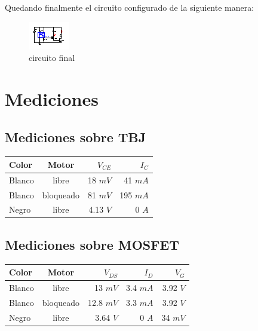 \documentclass[a4paper]{article}
\begin{document}
Quedando finalmente el circuito configurado de la siguiente manera:

\begin{figure}[H]
  \centering
    \includegraphics[width=\textwidth]{./xcircuit/Page_2.eps}
  \caption{circuito final}
\end{figure}

\section{Mediciones}

\subsection{Mediciones sobre TBJ}

\begin{tabular}{||l | c | r | r ||}
\hline
\hline
Color & Motor & $V_{CE}$ & $I_C$ \\
\hline
Blanco & libre & 18 $mV$ & 41 $mA$ \\
\hline
Blanco & bloqueado & 81 $mV$ & 195 $mA$\\
\hline
Negro & libre & 4.13 $V$ & 0 $A$\\
\hline
\end{tabular}

\subsection{Mediciones sobre MOSFET}

\begin{tabular}{||l | c | r | r | r||}
\hline
\hline
Color & Motor & $V_{DS}$ & $I_D$ & $V_G$\\
\hline
Blanco & libre & 13 $mV$ & 3.4 $mA$ & 3.92 $V$ \\
\hline
Blanco & bloqueado & 12.8 $mV$ & 3.3 $mA$ & 3.92 $V$ \\
\hline
Negro & libre & 3.64 $V$ & 0 $A$ & 34 $mV$ \\
\hline
\end{tabular}
\end{document}
